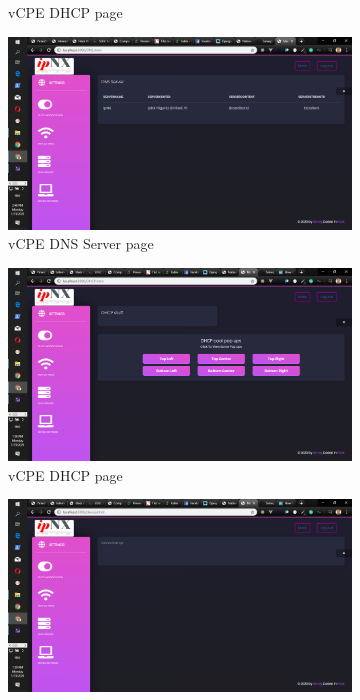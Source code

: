 \begin{figure}[!htbp]
\begin{subfigure}[b]{0.45\textwidth}
	\caption{\ac{vCPE} DHCP page}
\end{subfigure}
\hfill
\begin{subfigure}[b]{0.45\textwidth}
	\centering
	\includegraphics[width=\linewidth]{./vcpednsserver}
	\caption{\ac{vCPE}  DNS Server page}
\end{subfigure}
\medskip
\begin{subfigure}[b]{0.45\textwidth}
	\centering
	\includegraphics[width=\linewidth]{./vcpedhcp}
	\caption{\ac{vCPE} DHCP page}
\end{subfigure}
\hfill
\begin{subfigure}[b]{0.45\textwidth}
	\centering
	\includegraphics[width=\linewidth]{./vcpedevice}

\end{subfigure}
\end{figure}
